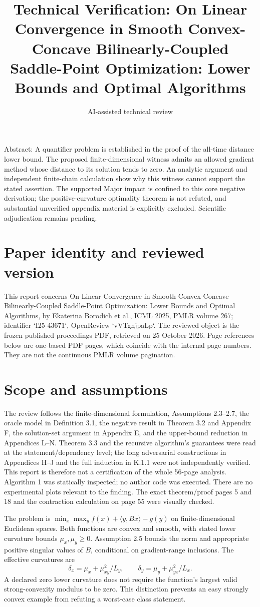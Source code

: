 \documentclass[10pt]{article}
\title{Technical Verification: On Linear Convergence in Smooth Convex-Concave Bilinearly-Coupled Saddle-Point Optimization: Lower Bounds and Optimal Algorithms}
\author{AI-assisted technical review}
\date{}
\begin{document}
\maketitle
Abstract: A quantifier problem is established in the proof of the all-time distance lower bound. The proposed finite-dimensional witness admits an allowed gradient method whose distance to its solution tends to zero. An analytic argument and independent finite-chain calculation show why this witness cannot support the stated assertion. The supported Major impact is confined to this core negative derivation; the positive-curvature optimality theorem is not refuted, and substantial unverified appendix material is explicitly excluded. Scientific adjudication remains pending.\par
\section*{Paper identity and reviewed version}
This report concerns On Linear Convergence in Smooth Convex-Concave Bilinearly-Coupled Saddle-Point Optimization: Lower Bounds and Optimal Algorithms, by Ekaterina Borodich et al., ICML 2025, PMLR volume 267; identifier `I25-43671`, OpenReview `vVTgnjpaLp`. The reviewed object is the frozen published proceedings PDF, retrieved on 25 October 2026. Page references below are one-based PDF pages, which coincide with the internal page numbers. They are not the continuous PMLR volume pagination.\par
\section*{Scope and assumptions}
The review follows the finite-dimensional formulation, Assumptions 2.3–2.7, the oracle model in Definition 3.1, the negative result in Theorem 3.2 and Appendix F, the solution-set argument in Appendix E, and the upper-bound reduction in Appendices L–N. Theorem 3.3 and the recursive algorithm’s guarantees were read at the statement/dependency level; the long adversarial constructions in Appendices H–J and the full induction in K.1.1 were not independently verified. This report is therefore not a certification of the whole 56-page analysis. Algorithm 1 was statically inspected; no author code was executed. There are no experimental plots relevant to the finding. The exact theorem/proof pages 5 and 18 and the contraction calculation on page 55 were visually checked.\par
The problem is \(\min_x\max_y f(x)+\langle y,Bx\rangle-g(y)\) on finite-dimensional Euclidean spaces. Both functions are convex and smooth, with stated lower curvature bounds \(\mu_x,\mu_y\geq0\). Assumption 2.5 bounds the norm and appropriate positive singular values of \(B\), conditional on gradient-range inclusions. The effective curvatures are \[\delta_x=\mu_x+\mu_{xy}^2/L_y,\qquad \delta_y=\mu_y+\mu_{yx}^2/L_x.\] A declared zero lower curvature does not require the function’s largest valid strong-convexity modulus to be zero. This distinction prevents an easy strongly convex example from refuting a worst-case class statement.\par
\end{document}
